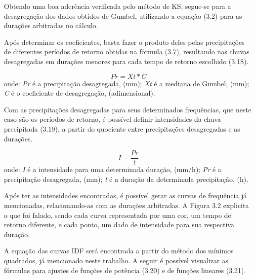 Obtendo uma boa aderência verificada pelo método de KS, segue-se para a desagregação dos dados obtidos de Gumbel, utilizando a equação (3.2) para as durações arbitradas no cálculo.

Após determinar os coeficientes, basta fazer o produto deles pelas precipitações de diferentes períodos de retorno obtidas na fórmula (3.7), resultando nas chuvas desagregadas em durações menores para cada tempo de retorno escolhido (3.18).\bigskip

\begin{equation}
Pr = Xt * C
\end{equation}
\newline
onde:
\newline
\textit{Pr} é a precipitação desagregada, (mm);
\newline
\textit{Xt} é a mediana de Gumbel, (mm);
\newline
\textit{C} é o coeficiente de desagregação, (adimensional).\bigskip

Com as precipitações desagregadas para seus determinados frequências, que neste caso são os períodos de retorno, é possível definir intensidades da chuva precipitada (3.19), a partir do quociente entre precipitações desagregadas e as durações.\bigskip

\begin{equation}
I = \frac{Pr}{t}
\end{equation}
\newline
onde:
\newline
\textit{I} é a intensidade para uma determinada duração, (mm/h);
\newline
\textit{Pr} é a precipitação desagregada, (mm);
\newline
\textit{t} é a duração da determinada precipitação, (h).\bigskip

Após ter as intensidades encontradas, é possível gerar as curvas de frequência já mencionadas, relacionando-as com as durações arbitradas. A Figura 3.2 explicita o que foi falado, sendo cada curva representada por uma cor, um tempo de retorno diferente, e cada ponto, um dado de intensidade para sua respectiva duração.

\bigskip

A equação das curvas IDF será encontrada a partir do método dos mínimos quadrados, já mencionado neste trabalho. A seguir é possível visualizar as fórmulas para ajustes de funções de potência (3.20) e de funções lineares (3.21).\bigskip

